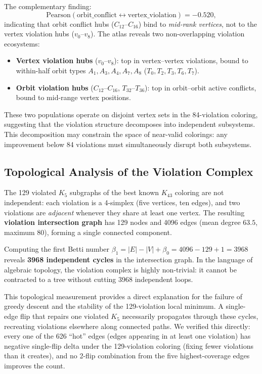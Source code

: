 \documentclass[11pt]{article}
\begin{document}
The complementary finding:
\[
\text{Pearson}(\text{orbit\_conflict} \leftrightarrow \text{vertex\_violation}) = -0.520,
\]
indicating that orbit conflict hubs ($C_{12}$--$C_{16}$) bind to
\emph{mid-rank vertices}, not to the vertex violation hubs ($v_0$--$v_8$).
The atlas reveals two non-overlapping violation ecosystems:
\begin{itemize}
\item \textbf{Vertex violation hubs} ($v_0$--$v_8$): top in vertex--vertex violations,
      bound to within-half orbit types $A_1, A_3, A_4, A_7, A_8$ ($T_0, T_2, T_3, T_6, T_7$).
\item \textbf{Orbit violation hubs} ($C_{12}$--$C_{16}$, $T_{32}$--$T_{36}$):
      top in orbit--orbit active conflicts, bound to mid-range vertex positions.
\end{itemize}
These two populations operate on disjoint vertex sets in the 84-violation coloring,
suggesting that the violation structure decomposes into independent subsystems.
This decomposition may constrain the space of near-valid colorings:
any improvement below 84 violations must simultaneously disrupt both subsystems.

\subsection{Topological Analysis of the Violation Complex}
\label{sec:topology}

The 129 violated $K_5$ subgraphs of the best known $K_{43}$ coloring are not independent:
each violation is a 4-simplex (five vertices, ten edges), and two violations are
\emph{adjacent} whenever they share at least one vertex.
The resulting \textbf{violation intersection graph} has 129 nodes and 4096 edges
(mean degree $63.5$, maximum $80$), forming a single connected component.

Computing the first Betti number $\beta_1 = |E| - |V| + \beta_0 = 4096 - 129 + 1 = 3968$
reveals \textbf{3968 independent cycles} in the intersection graph.
In the language of algebraic topology, the violation complex is highly non-trivial:
it cannot be contracted to a tree without cutting 3968 independent loops.

This topological measurement provides a direct explanation for the failure of
greedy descent and the stability of the 129-violation local minimum.
A single-edge flip that repairs one violated $K_5$ necessarily propagates
through these cycles, recreating violations elsewhere along connected paths.
We verified this directly: every one of the 626 ``hot'' edges (edges appearing
in at least one violation) has negative single-flip delta under the 129-violation coloring
(fixing fewer violations than it creates),
and no 2-flip combination from the five highest-coverage edges improves the count.
\end{document}
